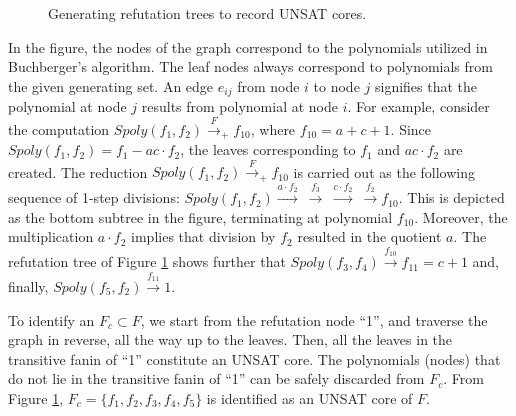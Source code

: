 \begin{figure}[tbp]
\caption{Generating refutation trees to record UNSAT cores.}
\label{fig:refute}
\end{figure}

In the figure, the nodes of the graph correspond to the polynomials
utilized in Buchberger's algorithm. The leaf nodes always correspond
to polynomials from the given generating set. An edge $e_{ij}$ from
node $i$ to node $j$ signifies that the polynomial at node $j$ results
from polynomial at node $i$. For example, consider the computation
$Spoly(f_1,f_2)\xrightarrow{F}_+ f_{10}$, where $f_{10} = a + c +
1$. Since $Spoly(f_1, f_2) = f_1 - ac\cdot f_2$, the leaves
corresponding to $f_1$ and $ac\cdot f_2$ are created. The reduction
$Spoly(f_1,f_2)\xrightarrow{F}_+ f_{10}$ is carried out as the
following sequence of 1-step divisions:
$Spoly(f_1,f_2)\xrightarrow{a\cdot f_2} ~\xrightarrow{f_3}~
\xrightarrow{c\cdot f_2}  ~\xrightarrow{f_2} f_{10}$. This is depicted
as the bottom subtree in the figure, terminating at polynomial
$f_{10}$. Moreover, the multiplication $a\cdot f_2$ implies that
division by $f_2$ resulted in the quotient $a$. The refutation tree of
Figure  \ref{fig:refute} shows further that
$Spoly(f_3,f_4)\xrightarrow{f_{10}} f_{11} = c+1$ and, finally,
$Spoly(f_5,f_2)\xrightarrow{f_{11}} 1$. 
 
To identify an $F_c \subset F$, we start from the refutation node
``1'', and traverse the graph in reverse, all the way up to the
leaves. Then, all the leaves in the transitive fanin of ``1''
constitute an UNSAT core. The polynomials (nodes) that do not lie in
the transitive fanin of ``1'' can be safely discarded from $F_c$. From
Figure \ref{fig:refute}, $F_c = \{f_1,f_2,f_3,f_4,f_5\}$ is identified
as an UNSAT core of $F$. 

